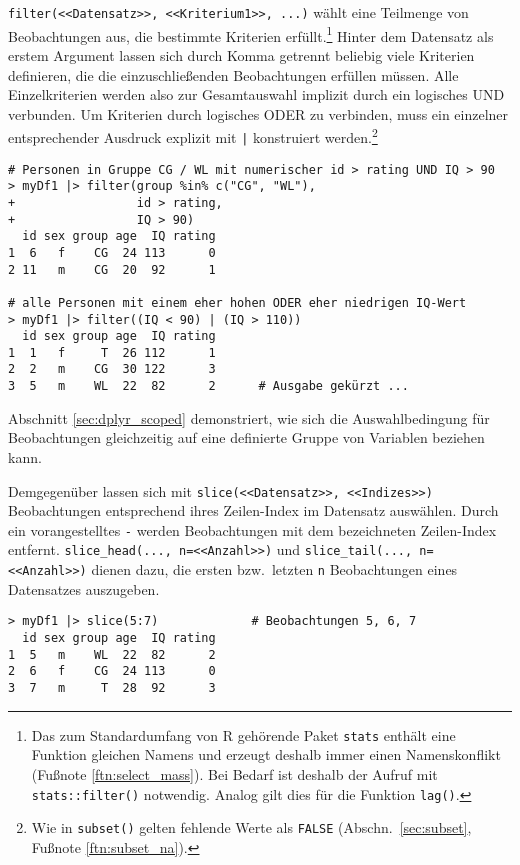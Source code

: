 \lstinline!filter(<<Datensatz>>, <<Kriterium1>>, ...)! wählt eine Teilmenge von Beobachtungen aus, die bestimmte Kriterien erfüllt.\footnote{Das zum Standardumfang von R gehörende Paket \lstinline!stats! enthält eine Funktion gleichen Namens und erzeugt deshalb immer einen Namenskonflikt (Fußnote \ref{ftn:select_mass}). Bei Bedarf ist deshalb der Aufruf mit \lstinline!stats::filter()! notwendig. Analog gilt dies für die Funktion \lstinline!lag()!.} Hinter dem Datensatz als erstem Argument lassen sich durch Komma getrennt beliebig viele Kriterien definieren, die die einzuschließenden Beobachtungen erfüllen müssen. Alle Einzelkriterien werden also zur Gesamtauswahl implizit durch ein logisches UND verbunden. Um Kriterien durch logisches ODER zu verbinden, muss ein einzelner entsprechender Ausdruck explizit mit \lstinline!|! konstruiert werden.\footnote{Wie in \lstinline!subset()! gelten fehlende Werte als \lstinline!FALSE! (Abschn.\ \ref{sec:subset}, Fußnote \ref{ftn:subset_na}).}
\begin{lstlisting}
# Personen in Gruppe CG / WL mit numerischer id > rating UND IQ > 90
> myDf1 |> filter(group %in% c("CG", "WL"),
+                 id > rating,
+                 IQ > 90)
  id sex group age  IQ rating
1  6   f    CG  24 113      0
2 11   m    CG  20  92      1

# alle Personen mit einem eher hohen ODER eher niedrigen IQ-Wert
> myDf1 |> filter((IQ < 90) | (IQ > 110))
  id sex group age  IQ rating
1  1   f     T  26 112      1
2  2   m    CG  30 122      3
3  5   m    WL  22  82      2      # Ausgabe gekürzt ...
\end{lstlisting}

Abschnitt \ref{sec:dplyr_scoped} demonstriert, wie sich die Auswahlbedingung für Beobachtungen gleichzeitig auf eine definierte Gruppe von Variablen beziehen kann.

Demgegenüber lassen sich mit \lstinline!slice(<<Datensatz>>, <<Indizes>>)! Beobachtungen entsprechend ihres Zeilen-Index im Datensatz auswählen. Durch ein vorangestelltes \lstinline!-! werden Beobachtungen mit dem bezeichneten Zeilen-Index entfernt. \lstinline!slice_head(..., n=<<Anzahl>>)! und \lstinline!slice_tail(..., n=<<Anzahl>>)! dienen dazu, die ersten bzw.\ letzten \lstinline!n! Beobachtungen eines Datensatzes auszugeben.
\begin{lstlisting}
> myDf1 |> slice(5:7)             # Beobachtungen 5, 6, 7
  id sex group age  IQ rating
1  5   m    WL  22  82      2
2  6   f    CG  24 113      0
3  7   m     T  28  92      3
\end{lstlisting}

